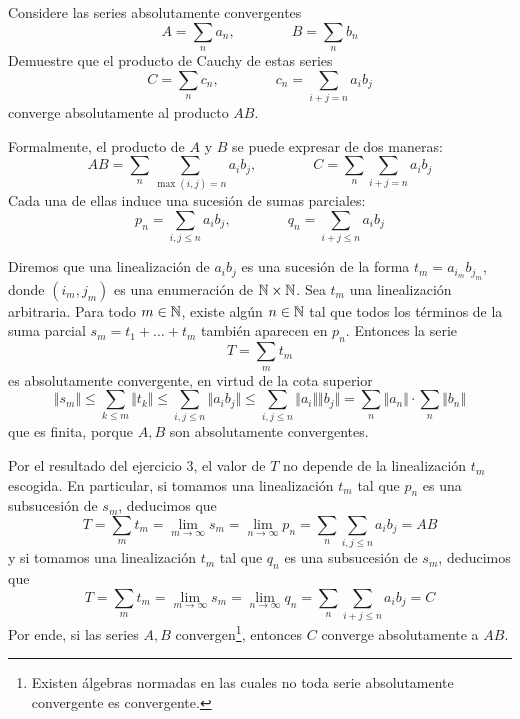 \begin{exercise}
Considere las series absolutamente convergentes
$$A = \sum_n a_n, \qquad \qquad B = \sum_n b_n$$
Demuestre que el producto de Cauchy de estas series
$$C = \sum_n c_n, \qquad \qquad c_n = \sum_{i+j=n} a_i b_j$$
converge absolutamente al producto $AB$.
\end{exercise}

\begin{solution}
Formalmente, el producto de $A$ y $B$ se puede expresar de dos maneras:
$$AB = \sum_n \sum_{\max(i,j)=n} a_i b_j, \qquad \qquad C = \sum_n \sum_{i+j=n} a_i b_j$$
Cada una de ellas induce una sucesión de sumas parciales:
$$p_n = \sum_{i,j \le n} a_i b_j, \qquad \qquad q_n = \sum_{i+j \le n} a_i b_j$$

Diremos que una linealización de $a_i b_j$ es una sucesión de la forma $t_m = a_{i_m} b_{j_m}$, donde $(i_m, j_m)$ es una enumeración de $\mathbb N \times \mathbb N$. Sea $t_m$ una linealización arbitraria. Para todo $m \in \mathbb N$, existe algún $n \in \mathbb N$ tal que todos los términos de la suma parcial $s_m = t_1 + \dots + t_m$ también aparecen en $p_n$. Entonces la serie
$$T = \sum_m t_m$$
es absolutamente convergente, en virtud de la cota superior
$$
\Vert s_m \Vert
    \le \sum_{k \le m} \Vert t_k \Vert
    \le \sum_{i,j \le n} \Vert a_i b_j \Vert
    \le \sum_{i,j \le n} \Vert a_i \Vert \Vert b_j \Vert
    = \sum_n \Vert a_n \Vert \cdot \sum_n \Vert b_n \Vert
$$
que es finita, porque $A, B$ son absolutamente convergentes.

Por el resultado del ejercicio 3, el valor de $T$ no depende de la linealización $t_m$ escogida. En particular, si tomamos una linealización $t_m$ tal que $p_n$ es una subsucesión de $s_m$, deducimos que
$$
T
    = \sum_m t_m
    = \lim_{m \to \infty} s_m
    = \lim_{n \to \infty} p_n
    = \sum_n \sum_{i,j \le n} a_i b_j
    = AB
$$
y si tomamos una linealización $t_m$ tal que $q_n$ es una subsucesión de $s_m$, deducimos que
$$
T
    = \sum_m t_m
    = \lim_{m \to \infty} s_m
    = \lim_{n \to \infty} q_n
    = \sum_n \sum_{i+j \le n} a_i b_j
    = C
$$
Por ende, si las series $A, B$ convergen\footnote{Existen álgebras normadas en las cuales no toda serie absolutamente convergente es convergente.}, entonces $C$ converge absolutamente a $AB$.
\end{solution}
